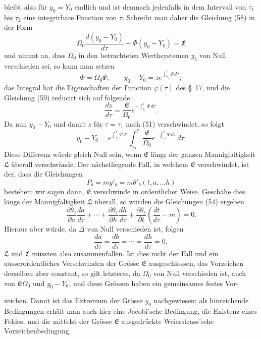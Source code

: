 \documentclass[11pt,a4paper,leqno]{article}
\begin{document}
bleibt also für $y_0=Y_0$ endlich und ist demnach jedenfalls in dem
Intervall von $\tau_1$ bis $\tau_2$ eine integrirbare Function von
$\tau$. Schreibt man daher die Gleichung (58) in der Form
\begin{equation}\tag{59}
\Omega_0\frac{d(y_0-Y_0)}{d\tau}-\Phi(y_0-Y_0)=\mathfrak{E}
\end{equation}
und nimmt an, dass $\Omega_0$ in den betrachteten Werthsystemen $y_b$
von Null verschieden sei, so kann man setzen
\[
\Phi=\Omega_0\Psi,\qquad
y_0-Y_0=z e^{\int_{\tau_1}^{\tau}\Psi\,d\tau};
\]
das Integral hat die Eigenschaften der Function $\varphi(\tau)$ des
\S~17, und die Gleichung (59) reducirt sich auf folgende
\[
\frac{dz}{d\tau}=\frac{\mathfrak{E}}{\Omega_0}
e^{-\int_{\tau_1}^{\tau}\Psi\,d\tau}.
\]
Da nun $y_0-Y_0$ und damit $z$ für $\tau=\tau_1$ nach (51)
verschwindet, so folgt
\[
y_0-Y_0=e^{\int_{\tau_1}^{\tau}\Psi\,d\tau}
\int_{\tau_1}^{\tau}\frac{\mathfrak{E}}{\Omega_0}
e^{-\int_{\tau_1}^{\tau}\Psi\,d\tau}\,d\tau.
\]
Diese Differenz würde gleich Null sein, wenn $\mathfrak{E}$ längs der
ganzen Mannigfaltigkeit $\mathfrak{L}$ überall verschwände. Der
nächstliegende Fall, in welchem $\mathfrak{E}$ verschwindet, ist der,
dass die Gleichungen
\[
P_b=my'_b=m\theta'_b(t,a,\ldots h)
\]
bestehen; wir sagen dann, $\mathfrak{E}$ verschwinde in ordentlicher
Weise. Geschähe dies längs der Mannigfaltigkeit $\mathfrak{L}$ überall,
so würden die Gleichungen (54) ergeben
\[
\frac{\partial\theta_c}{\partial a}\frac{da}{d\tau}
+\cdots+
\frac{\partial\theta_c}{\partial h}\frac{dh}{d\tau}
+\frac{\partial\theta_c}{\partial t}
\left(\frac{dt}{d\tau}-m\right)=0.
\]
Hieraus aber würde, da $\Delta$ von Null verschieden ist, folgen
\[
\frac{da}{d\tau}=\frac{db}{d\tau}=\cdots=\frac{dh}{d\tau}=0,
\]
$\mathfrak{L}$ und $\mathfrak{C}$ müssten also zusammenfallen. Ist dies
nicht der Fall und ein ausserordentliches Verschwinden der Grösse
$\mathfrak{E}$ ausgeschlossen, das Vorzeichen derselben aber constant,
so gilt letzteres, da $\Omega_0$ von Null verschieden ist, auch von
$\mathfrak{E}\Omega_0$ und $y_0-Y_0$, und diese Grössen haben ein
gemeinsames festes Vor-

zeichen. Damit ist das Extremum der Grösse $y_0$ nachgewiesen; als
hinreichende Bedingungen erhält man auch hier eine Jacobi'sche
Bedingung, die Existenz eines Feldes, und die mittelst der Grösse
$\mathfrak{E}$ ausgedrückte Weierstrass'sche Vorzeichenbedingung.
\end{document}

